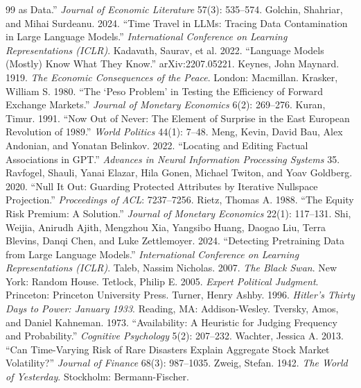 \documentclass[11pt]{article}
\begin{document}
\begin{thebibliography}{99}
as Data.'' \emph{Journal of Economic Literature} 57(3): 535--574.
 Golchin, Shahriar, and Mihai Surdeanu. 2024. ``Time
Travel in LLMs: Tracing Data Contamination in Large Language Models.'' \emph{International Conference on
Learning Representations (ICLR)}.
 Kadavath, Saurav, et al. 2022. ``Language Models (Mostly)
Know What They Know.'' arXiv:2207.05221.
 Keynes, John Maynard. 1919. \emph{The Economic Consequences of the
Peace}. London: Macmillan.
 Krasker, William S. 1980. ``The `Peso Problem' in Testing the
Efficiency of Forward Exchange Markets.'' \emph{Journal of Monetary Economics} 6(2): 269--276.
 Kuran, Timur. 1991. ``Now Out of Never: The Element of Surprise in the East
European Revolution of 1989.'' \emph{World Politics} 44(1): 7--48.
 Meng, Kevin, David Bau, Alex Andonian, and Yonatan Belinkov. 2022.
``Locating and Editing Factual Associations in GPT.'' \emph{Advances in Neural Information Processing
Systems} 35.
 Ravfogel, Shauli, Yanai Elazar, Hila Gonen, Michael Twiton,
and Yoav Goldberg. 2020. ``Null It Out: Guarding Protected Attributes by Iterative Nullspace Projection.''
\emph{Proceedings of ACL}: 7237--7256.
 Rietz, Thomas A. 1988. ``The Equity Risk Premium: A Solution.''
\emph{Journal of Monetary Economics} 22(1): 117--131.
 Shi, Weijia, Anirudh Ajith, Mengzhou Xia, Yangsibo Huang, Daogao Liu,
Terra Blevins, Danqi Chen, and Luke Zettlemoyer. 2024. ``Detecting Pretraining Data from Large Language
Models.'' \emph{International Conference on Learning Representations (ICLR)}.
 Taleb, Nassim Nicholas. 2007. \emph{The Black Swan}. New York: Random House.
 Tetlock, Philip E. 2005. \emph{Expert Political Judgment}. Princeton:
Princeton University Press.
 Turner, Henry Ashby. 1996. \emph{Hitler's Thirty Days to Power: January
1933}. Reading, MA: Addison-Wesley.
 Tversky, Amos, and Daniel Kahneman. 1973. ``Availability:
A Heuristic for Judging Frequency and Probability.'' \emph{Cognitive Psychology} 5(2): 207--232.
 Wachter, Jessica A. 2013. ``Can Time-Varying Risk of Rare Disasters
Explain Aggregate Stock Market Volatility?'' \emph{Journal of Finance} 68(3): 987--1035.
 Zweig, Stefan. 1942. \emph{The World of Yesterday}. Stockholm:
Bermann-Fischer.
\end{thebibliography}
\end{document}
